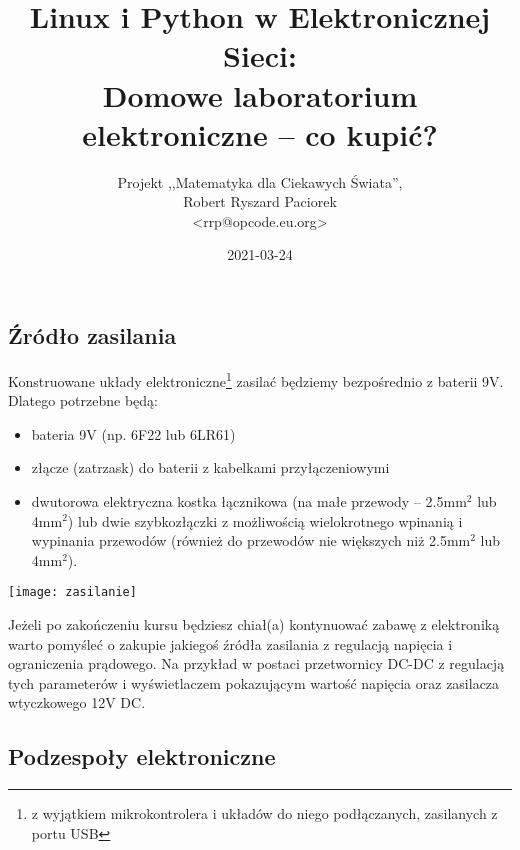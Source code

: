 \documentclass{pdfBooklets}
\title{Linux i Python w Elektronicznej Sieci:\\ Domowe laboratorium elektroniczne – co kupić?}
\author{%
	Projekt ,,Matematyka dla Ciekawych Świata'',\\
	Robert Ryszard Paciorek\\\normalsize\ttfamily <rrp@opcode.eu.org>
}
\date  {2021-03-24}
\begin{document}
\maketitle

%



%



%
\subsection{Źródło zasilania}

Konstruowane układy elektroniczne\footnote{z wyjątkiem mikrokontrolera i układów do niego podłączanych, zasilanych z portu USB} zasilać będziemy bezpośrednio z baterii 9V. Dlatego potrzebne będą:

\begin{itemize}
	\item bateria 9V (np. 6F22 lub 6LR61)
	\item złącze (zatrzask) do baterii z kabelkami przyłączeniowymi
	\item dwutorowa elektryczna kostka łącznikowa (na małe przewody – 2.5mm$^2$ lub 4mm$^2$) lub dwie szybkozłączki z możliwością wielokrotnego wpinanią i wypinania przewodów (również do przewodów nie większych niż 2.5mm$^2$ lub 4mm$^2$).
\end{itemize}

\begin{center}\texttt{[image: zasilanie]}\end{center}

Jeżeli po zakończeniu kursu będziesz chiał(a) kontynuować zabawę z elektroniką warto pomyśleć o zakupie jakiegoś źródła zasilania z regulacją napięcia i ograniczenia prądowego.
Na przykład w postaci przetwornicy DC-DC z regulacją tych parameterów i wyświetlaczem pokazującym wartość napięcia oraz zasilacza wtyczkowego 12V DC.

\subsection{Podzespoły elektroniczne}
\end{document}
